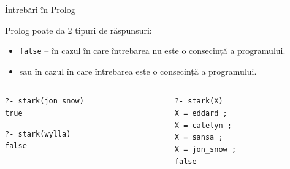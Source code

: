 \documentclass[xcolor=x11names,compress,10pt]{beamer}
\begin{document}

\begin{frame}{\^Intrebări în Prolog}


Prolog poate da 2 tipuri de răspunsuri:
	\begin{itemize}
		\item {\color{red} \texttt{false}} -- în cazul în care întrebarea nu este o consecință a programului.
		\smallskip
		\item {} sau  în cazul în care întrebarea este o consecință a programului.
	\end{itemize}

\pause
\begin{example}
\smallskip
\begin{columns}
\begin{column}{.4\textwidth}
 \texttt{?- stark(jon\_snow)} \\
	  \texttt{true}
	  
\texttt{?- stark(wylla)} \\
	  \texttt{false}
\vspace{.8cm}	
\end{column}
\begin{column}{.4\textwidth}
\texttt{?- stark(X)} \\
	\texttt{X = eddard ;} \\
	\texttt{X = catelyn ;} \\
	\texttt{X = sansa ;} \\
	\texttt{X = jon\_snow ;} \\
	\texttt{false} \\
\end{column}
\end{columns}
\smallskip
\end{example}
\end{frame}






\end{document}
